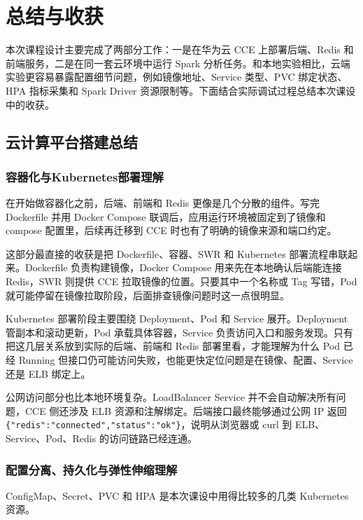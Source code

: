 \section{总结与收获}

本次课程设计主要完成了两部分工作：一是在华为云 CCE 上部署后端、Redis 和前端服务，二是在同一套云环境中运行 Spark 分析任务。和本地实验相比，云端实验更容易暴露配置细节问题，例如镜像地址、Service 类型、PVC 绑定状态、HPA 指标采集和 Spark Driver 资源限制等。下面结合实际调试过程总结本次课设中的收获。

\subsection{云计算平台搭建总结}

\subsubsection{容器化与Kubernetes部署理解}

在开始做容器化之前，后端、前端和 Redis 更像是几个分散的组件。写完 Dockerfile 并用 Docker Compose 联调后，应用运行环境被固定到了镜像和 compose 配置里，后续再迁移到 CCE 时也有了明确的镜像来源和端口约定。

这部分最直接的收获是把 Dockerfile、容器、SWR 和 Kubernetes 部署流程串联起来。Dockerfile 负责构建镜像，Docker Compose 用来先在本地确认后端能连接 Redis，SWR 则提供 CCE 拉取镜像的位置。只要其中一个名称或 Tag 写错，Pod 就可能停留在镜像拉取阶段，后面排查镜像问题时这一点很明显。

Kubernetes 部署阶段主要围绕 Deployment、Pod 和 Service 展开。Deployment 管副本和滚动更新，Pod 承载具体容器，Service 负责访问入口和服务发现。只有把这几层关系放到实际的后端、前端和 Redis 部署里看，才能理解为什么 Pod 已经 Running 但接口仍可能访问失败，也能更快定位问题是在镜像、配置、Service 还是 ELB 绑定上。

公网访问部分也比本地环境复杂。LoadBalancer Service 并不会自动解决所有问题，CCE 侧还涉及 ELB 资源和注解绑定。后端接口最终能够通过公网 IP 返回 \verb|{"redis":"connected","status":"ok"}|，说明从浏览器或 curl 到 ELB、Service、Pod、Redis 的访问链路已经连通。

\subsubsection{配置分离、持久化与弹性伸缩理解}

ConfigMap、Secret、PVC 和 HPA 是本次课设中用得比较多的几类 Kubernetes 资源。

